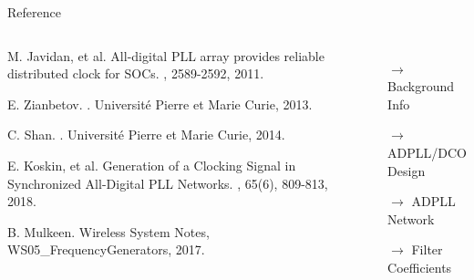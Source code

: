 \documentclass{beamer}
\begin{document}
\begin{frame}{Reference}
	\begin{columns}
		\begin{thebibliography}{10}
		\begin{tiny}
		M. Javidan, et al.
		\newblock All-digital PLL array provides reliable distributed clock for SOCs.
		, 2589-2592, 2011. %
  	
	    E. Zianbetov.
	    .
		\newblock Universit\'e Pierre et Marie Curie, 2013. %
		
		C. Shan.
		.
		\newblock Universit\'e Pierre et Marie Curie, 2014. %
		
	    E. Koskin, et al.
	    \newblock Generation of a Clocking Signal in Synchronized All-Digital PLL Networks.
	    , 65(6), 809-813, 2018. %

	    B. Mulkeen.
	    \newblock Wireless System Notes, WS05\_FrequencyGenerators, 2017. %
	    
	    \end{tiny}
	  	\end{thebibliography}
  		\begin{itemize}
  			\item[$\rightarrow$] Background Info
  			\vspace{0.6 cm}
  			\item[$\rightarrow$] ADPLL/DCO Design
  			\vspace{0.6 cm}
  			\item[$\rightarrow$] ADPLL Network
  			\vspace{0.6 cm}
  			\item[$\rightarrow$] Filter Coefficients
  		\end{itemize}
  \end{columns}
\end{frame}
\end{document}
